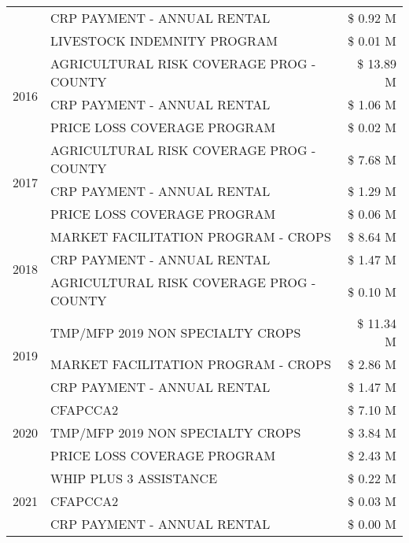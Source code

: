 \begin{tabular}{llr}
 & CRP PAYMENT - ANNUAL RENTAL & \$ 0.92 M \\
 & LIVESTOCK INDEMNITY PROGRAM & \$ 0.01 M \\
\cline{1-3}
\multirow[t]{3}{*}{2016} & AGRICULTURAL RISK COVERAGE PROG - COUNTY      & \$ 13.89 M \\
 & CRP PAYMENT - ANNUAL RENTAL                   & \$ 1.06 M \\
 & PRICE LOSS COVERAGE PROGRAM                   & \$ 0.02 M \\
\cline{1-3}
\multirow[t]{3}{*}{2017} & AGRICULTURAL RISK COVERAGE PROG - COUNTY & \$ 7.68 M \\
 & CRP PAYMENT - ANNUAL RENTAL & \$ 1.29 M \\
 & PRICE LOSS COVERAGE PROGRAM & \$ 0.06 M \\
\cline{1-3}
\multirow[t]{3}{*}{2018} & MARKET FACILITATION PROGRAM - CROPS & \$ 8.64 M \\
 & CRP PAYMENT - ANNUAL RENTAL & \$ 1.47 M \\
 & AGRICULTURAL RISK COVERAGE PROG - COUNTY & \$ 0.10 M \\
\cline{1-3}
\multirow[t]{3}{*}{2019} & TMP/MFP 2019 NON SPECIALTY CROPS & \$ 11.34 M \\
 & MARKET FACILITATION PROGRAM - CROPS & \$ 2.86 M \\
 & CRP PAYMENT - ANNUAL RENTAL & \$ 1.47 M \\
\cline{1-3}
\multirow[t]{3}{*}{2020} & CFAPCCA2 & \$ 7.10 M \\
 & TMP/MFP 2019 NON SPECIALTY CROPS & \$ 3.84 M \\
 & PRICE LOSS COVERAGE PROGRAM & \$ 2.43 M \\
\cline{1-3}
\multirow[t]{3}{*}{2021} & WHIP PLUS 3 ASSISTANCE & \$ 0.22 M \\
 & CFAPCCA2 & \$ 0.03 M \\
 & CRP PAYMENT - ANNUAL RENTAL & \$ 0.00 M \\
\cline{1-3}
\bottomrule
\end{tabular}
